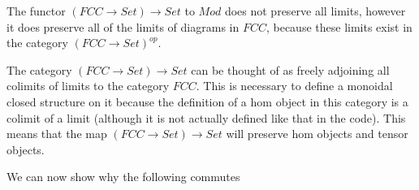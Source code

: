 \documentclass[12pt]{article} %
\theoremstyle{definition}
\theoremstyle{definition}
\theoremstyle{definition}
\theoremstyle{definition}
\begin{document}

The functor $(FCC \rightarrow Set) \rightarrow Set$ to $Mod$ does not preserve all limits, however it does 
preserve all of the limits of diagrams in $FCC$, because these limits exist in the category $(FCC \rightarrow Set)^{op}$.

The category $(FCC \rightarrow Set) \rightarrow Set$ can be thought of as freely adjoining all colimits of limits to the category $FCC$.
This is necessary to define a monoidal closed structure on it because the definition of a hom object in this category is a 
colimit of a limit (although it is not actually defined like that in the code). This means that the map
$(FCC \rightarrow Set) \rightarrow Set$ will preserve hom objects and tensor objects. 

We can now show why the following commutes
\end{document}
